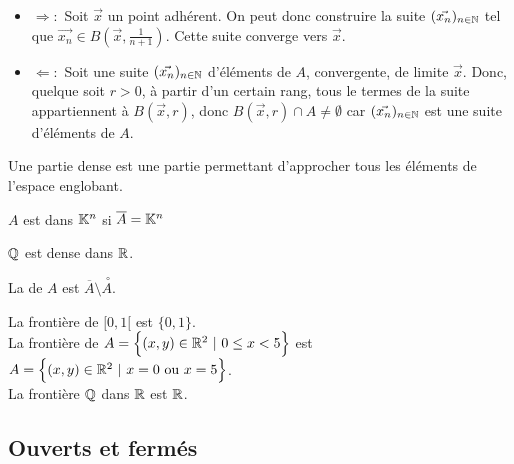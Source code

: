 \documentclass{book}
\begin{document}
\begin{Demonstration}
\begin{itemize}
\item $\Rightarrow :$ Soit $\vec{x}$ un point adhérent. On peut donc construire la suite $(\vec{x_n})_{n\in\mathbb{N}}$ tel que $\vec{x_n}\in B (\vec{x}, \frac{1}{n+1} )$. Cette suite converge vers $\vec{x}$. 
\item $\Leftarrow :$ Soit une suite $(\vec{x_n})_{n\in\mathbb{N}}$ d'éléments de $A$, convergente, de limite $\vec{x}$. Donc, quelque soit $r>0$, à partir d'un certain rang, tous le termes de la suite appartiennent à  $B (\vec{x}, r)$, donc $B (\vec{x}, r) \cap A\neq \emptyset$ car $(\vec{x_n})_{n\in\mathbb{N}}$ est une suite d'éléments de $A$.
\end{itemize}
\end{Demonstration}
Une partie dense est une partie permettant d'approcher tous les éléments de l'espace englobant.
\begin{Definition}[Dense]
$A$ est  dans $\mathbb{K}^n$ si $\overline {A}=\mathbb{K}^n$
\end{Definition}
\begin{Exemple}
$\mathbb{Q}$ est dense dans $\mathbb{R}$.
\end{Exemple}
\begin{Definition}[Frontière]
La  de $A$ est $\overline {A}\setminus \stackrel {\ \circ }{A}.$
\end{Definition}
\begin{Exemple}
La frontière de $[0,1[$ est $ \{0,1\}$.\\
La frontière  de  $A  =\Big\{(x,y)\in\R^2\ |\ 0\leq x<5 \Big\}$ est  
$A  =\Big\{(x,y)\in\mathbb{R}^2\ |\ x=0\text{ ou } x=5  \Big\}$.\\ 
La frontière  $\mathbb{Q}$ dans $\mathbb{R}$ est $\mathbb{R}$.
\end{Exemple}

\subsection{Ouverts et fermés}
\end{document}

